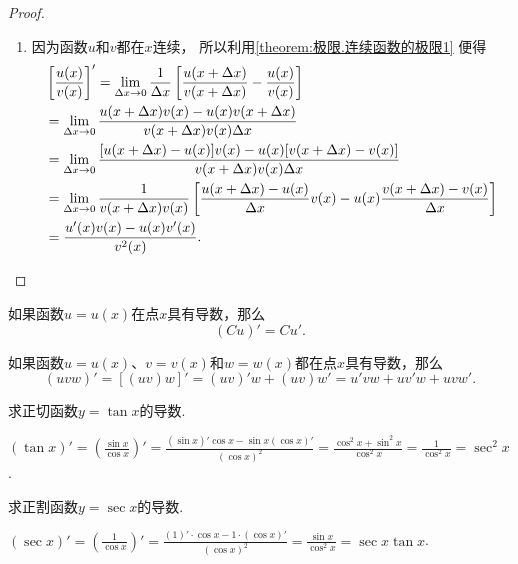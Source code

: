 \begin{theorem}
\begin{proof}
\begin{enumerate}
\item 因为函数\(u\)和\(v\)都在\(x\)连续，
所以利用\cref{theorem:极限.连续函数的极限1} 便得
\begin{align*}
&\left[ \frac{u(x)}{v(x)} \right]'
= \lim\limits_{\Delta x\to0} \frac{1}{\Delta x} \left[
 \frac{u(x+\Delta x)}{v(x+\Delta x)} - \frac{u(x)}{v(x)}
 \right] \\
&= \lim\limits_{\Delta x\to0} \frac{u(x+\Delta x) v(x) - u(x) v(x+\Delta x)}{v(x+\Delta x) v(x) \Delta x} \\
&= \lim\limits_{\Delta x\to0} \frac{[u(x+\Delta x) - u(x)] v(x) - u(x) [v(x+\Delta x) - v(x)]}{v(x+\Delta x) v(x) \Delta x} \\
&= \lim\limits_{\Delta x\to0} \frac{1}{v(x+\Delta x) v(x)} \left[
 \frac{u(x+\Delta x) - u(x)}{\Delta x} v(x) - u(x) \frac{v(x+\Delta x) - v(x)}{\Delta x}
 \right] \\
&= \frac{u'(x) v(x) - u(x) v'(x)}{v^2(x)}.
\qedhere
\end{align*}
\end{enumerate}
\end{proof}
\end{theorem}

\begin{corollary}
如果函数\(u=u(x)\)在点\(x\)具有导数，那么\[
(C u)' = C u'.
\]
\end{corollary}

\begin{corollary}
如果函数\(u=u(x)\)、\(v=v(x)\)和\(w=w(x)\)都在点\(x\)具有导数，那么\[
(uvw)' = [(uv)w]' = (uv)'w + (uv)w' = u'vw + uv'w + uvw'.
\]
\end{corollary}

\begin{example}
求正切函数\(y=\tan x\)的导数.
\begin{solution}
\((\tan x)'
= \left(\frac{\sin x}{\cos x}\right)'
= \frac{(\sin x)' \cos x - \sin x (\cos x)'}{(\cos x)^2}
= \frac{\cos^2 x + \sin^2 x}{\cos^2 x}
= \frac{1}{\cos^2 x}
= \sec^2 x\).
\end{solution}
\end{example}

\begin{example}
求正割函数\(y=\sec x\)的导数.
\begin{solution}
\((\sec x)'
= \left(\frac{1}{\cos x}\right)'
= \frac{(1)' \cdot \cos x - 1 \cdot (\cos x)'}{(\cos x)^2}
= \frac{\sin x}{\cos^2 x}
= \sec x \tan x\).
\end{solution}
\end{example}

